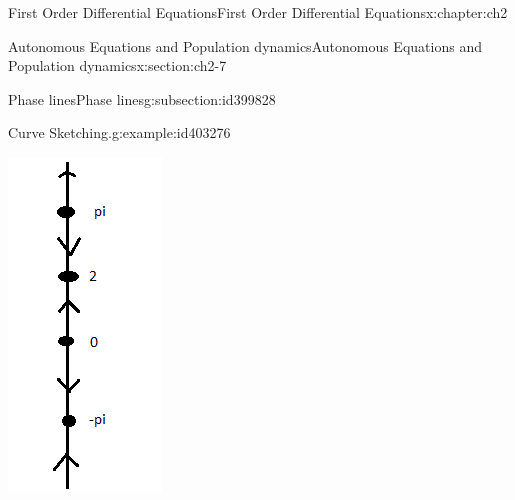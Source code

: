 \documentclass[oneside,10pt,]{book}
\numberwithin{equation}{section}
\numberwithin{equation}{section}
\begin{document}
\begin{chapterptx}{First Order Differential Equations}{}{First Order Differential Equations}{}{}{x:chapter:ch2}
\begin{sectionptx}{Autonomous Equations and Population dynamics}{}{Autonomous Equations and Population dynamics}{}{}{x:section:ch2-7}
\begin{subsectionptx}{Phase lines}{}{Phase lines}{}{}{g:subsection:id399828}
\begin{example}{Curve Sketching.}{g:example:id403276}
\begin{enumerate}
\begin{image}{0.35}{0.3}{0.35}
\includegraphics[width=\linewidth]{images/1.6-Phase2.png}

\end{image}
\end{enumerate}
\end{example}
\end{subsectionptx}
\end{sectionptx}
\end{chapterptx}
\end{document}
